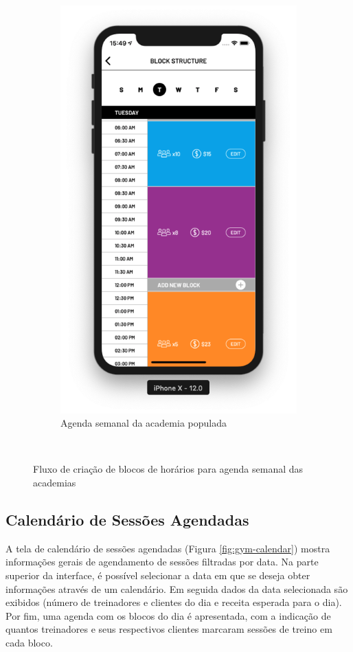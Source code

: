 \begin{figure}[H]
\begin{subfigure}[b]{0.3\textwidth}
        \includegraphics[width=\textwidth]{pfc/figuras/gym-block-structure.png}
        \caption{Agenda semanal da academia populada}
        \label{fig:gym-block}
    \end{subfigure}
    ~
    \caption{Fluxo de criação de blocos de horários para agenda semanal das academias}
    \label{fig:}
\end{figure}

\subsection{Calendário de Sessões Agendadas}
A tela de calendário de sessões agendadas (Figura \ref{fig:gym-calendar}) mostra informações gerais de agendamento de sessões filtradas por data. Na parte superior da interface, é possível selecionar a data em que se deseja obter informações através de um calendário. Em seguida dados da data selecionada são exibidos (número de treinadores e clientes do dia e receita esperada para o dia). Por fim, uma agenda com os blocos do dia é apresentada, com a indicação de quantos treinadores e seus respectivos clientes marcaram sessões de treino em cada bloco.

